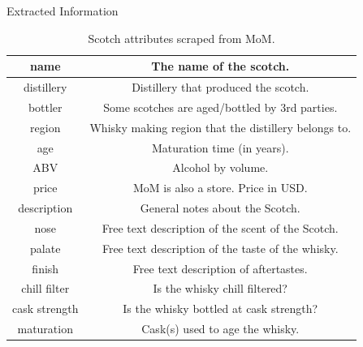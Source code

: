 \documentclass{beamer}
\begin{document}
	\begin{frame}{Extracted Information}
	
	\begin{table}[H]
		\begin{center}
		\begin{tabular}{|c|c|}
			\hline
			name &  The name of the scotch.\\
			\hline
			distillery &  Distillery that produced the scotch.\\
			\hline
			bottler &  Some scotches are aged/bottled by 3rd parties. \\
			\hline
			region & Whisky making region that the distillery belongs to. \\
			\hline
			age & Maturation time (in years).  \\
			\hline
			ABV & Alcohol by volume. \\
			\hline
			price & MoM is also a store. Price in USD.  \\
			\hline
			description & General notes about the Scotch.  \\
			\hline
			nose & Free text description of the scent of the Scotch.  \\
			\hline
			palate & Free text description of the taste of the whisky. \\
			\hline
			finish & Free text description of aftertastes.  \\
			\hline
			chill filter & Is the whisky chill filtered? \\
			\hline
			cask strength & Is the whisky bottled at cask strength? \\
			\hline
			maturation & Cask(s) used to age the whisky. \\
			
			\hline
		\end{tabular}
		\caption{Scotch attributes scraped from MoM.}
	\end{center}
	\end{table}
	
	
\end{frame}
\end{document}
